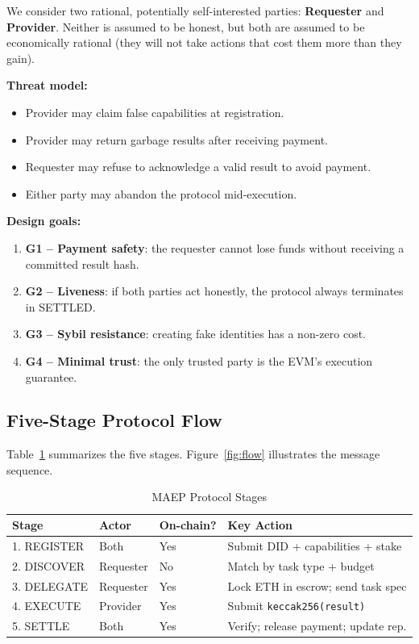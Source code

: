 \documentclass[conference]{IEEEtran}
\begin{document}
We consider two rational, potentially self-interested parties:
\textbf{Requester} and \textbf{Provider}.  Neither is assumed to be
honest, but both are assumed to be economically rational (they will
not take actions that cost them more than they gain).

\textbf{Threat model:}
\begin{itemize}
\item Provider may claim false capabilities at registration.
\item Provider may return garbage results after receiving payment.
\item Requester may refuse to acknowledge a valid result to avoid payment.
\item Either party may abandon the protocol mid-execution.
\end{itemize}

\textbf{Design goals:}
\begin{enumerate}
\item \textbf{G1 -- Payment safety}: the requester cannot lose funds
  without receiving a committed result hash.
\item \textbf{G2 -- Liveness}: if both parties act honestly, the
  protocol always terminates in SETTLED.
\item \textbf{G3 -- Sybil resistance}: creating fake identities has a
  non-zero cost.
\item \textbf{G4 -- Minimal trust}: the only trusted party is the
  EVM's execution guarantee.
\end{enumerate}

\subsection{Five-Stage Protocol Flow}

Table~\ref{tab:stages} summarizes the five stages.  Figure~\ref{fig:flow}
illustrates the message sequence.

\begin{table}[h]
\caption{MAEP Protocol Stages}
\label{tab:stages}
\centering
\begin{tabular}{llll}
\toprule
\textbf{Stage} & \textbf{Actor} & \textbf{On-chain?} & \textbf{Key Action} \\
\midrule
1. REGISTER  & Both     & Yes & Submit DID + capabilities + stake \\
2. DISCOVER  & Requester & No  & Match by task type + budget \\
3. DELEGATE  & Requester & Yes & Lock ETH in escrow; send task spec \\
4. EXECUTE   & Provider  & Yes & Submit \texttt{keccak256(result)} \\
5. SETTLE    & Both      & Yes & Verify; release payment; update rep. \\
\bottomrule
\end{tabular}
\end{table}
\end{document}
